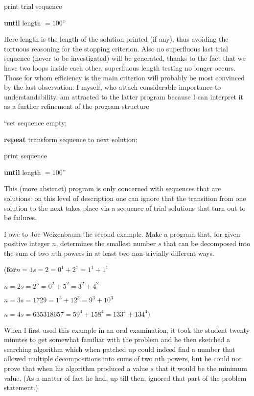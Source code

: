 \quad \quad print trial sequence

\quad \textbf{until} length $= 100$''

Here length is the length of the solution printed (if any), thus avoiding the tortuous reasoning for the stopping criterion. Also no superfluous last trial sequence (never to be investigated) will be generated, thanks to the fact that we have two loops inside each other, superfluous length testing no longer occurs. Those for whom efficiency is the main criterion will probably be most convinced by the last observation. I myself, who attach considerable importance to understandability, am attracted to the latter program because I can interpret it as a further refinement of the program structure

\quad \hspace{-.4em}``set sequence empty;

\quad \textbf{repeat} transform sequence to next solution;

\quad \quad print sequence

\quad \textbf{until} length $= 100$''

This (more abstract) program is only concerned with sequences that are solutions: on this level of description one can ignore that the transition from one solution to the next takes place via a sequence of trial solutions that turn out to be failures.

I owe to Joe Weizenbaum the second example. Make a program that, for given positive integer $n$, determines the smallest number $s$ that can be decomposed into the sum of two $n$th powers in at least two non-trivially different ways.

\noindent
(\textbf{for}\tabto{2em}$n = 1$\tabto{6em}$s = 2 = 0^1 + 2^1 = 1^1 + 1^1$

\tabto{2em}$n = 2$\tabto{6em}$s = 2^5 = 0^2 + 5^2 = 3^2 + 4^2$

\tabto{2em}$n=3$\tabto{6em}$s=1729=1^3 +12^3 =9^3 +10^3$

\tabto{2em}$n = 4$\tabto{6em}$s = 635318657 = 59^4 + 158^4 = 133^4 + 134^4)$

When I first used this example in an oral examination, it took the student twenty minutes to get somewhat familiar with the problem and he then sketched a searching algorithm which \textemdash{}  when patched up \textemdash{}  could indeed find a number that allowed multiple decompositions into sums of two nth powers, but he could not prove that when his algorithm produced a value $s$ that it would be the minimum value. (As a matter of fact he had, up till then, ignored that part of the problem statement.)

